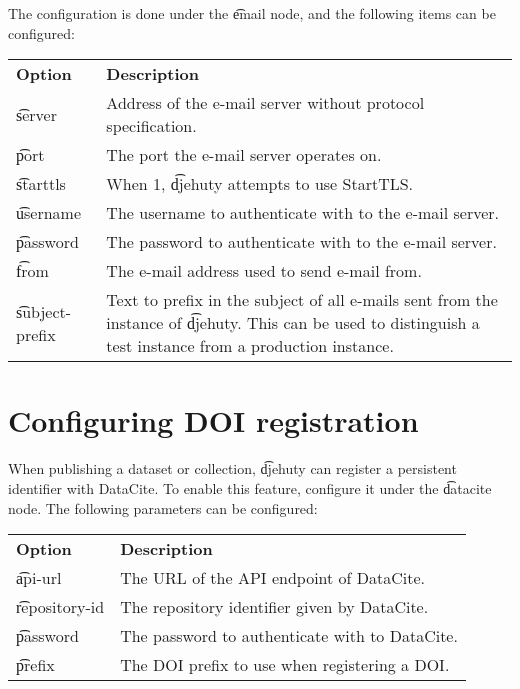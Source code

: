   The configuration is done under the \t{email} node, and the following
  items can be configured:

\begin{tabularx}{\textwidth}{*{1}{!{\VRule[-1pt]}l}!{\VRule[-1pt]}X}
  \headrow
  \textbf{Option}             & \textbf{Description}\\
  \t{server}                  & Address of the e-mail server without protocol
                                specification.\\
  \t{port}                    & The port the e-mail server operates on.\\
  \t{starttls}                & When 1, \t{djehuty} attempts to use StartTLS.\\
  \t{username}                & The username to authenticate with to the
                                e-mail server.\\
  \t{password}                & The password to authenticate with to the
                                e-mail server.\\
  \t{from}                    & The e-mail address used to send e-mail from.\\
  \t{subject-prefix}          & Text to prefix in the subject of all e-mails
                                sent from the instance of \t{djehuty}.  This
                                can be used to distinguish a test instance from
                                a production instance.
\end{tabularx}

\section{Configuring DOI registration}

  When publishing a dataset or collection, \t{djehuty} can register a
  persistent identifier with DataCite.  To enable this feature, configure it
  under the \t{datacite} node. The following parameters can be configured:

\begin{tabularx}{\textwidth}{*{1}{!{\VRule[-1pt]}l}!{\VRule[-1pt]}X}
  \headrow
  \textbf{Option}             & \textbf{Description}\\
  \t{api-url}                 & The URL of the API endpoint of DataCite.\\
  \t{repository-id}           & The repository identifier given by DataCite.\\
  \t{password}                & The password to authenticate with to DataCite.\\
  \t{prefix}                  & The DOI prefix to use when registering a DOI.
\end{tabularx}

